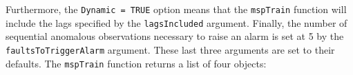 \documentclass{report}\usepackage[]{graphicx}\usepackage[]{color}
\begin{document}
Furthermore, the \texttt{Dynamic = TRUE} option means that the \texttt{mspTrain} function will include the lags specified by the \texttt{lagsIncluded} argument. Finally, the number of sequential anomalous observations necessary to raise an alarm is set at 5 by the \texttt{faultsToTriggerAlarm} argument. These last three arguments are set to their defaults.
The \texttt{mspTrain} function returns a list of four objects:
\end{document}
